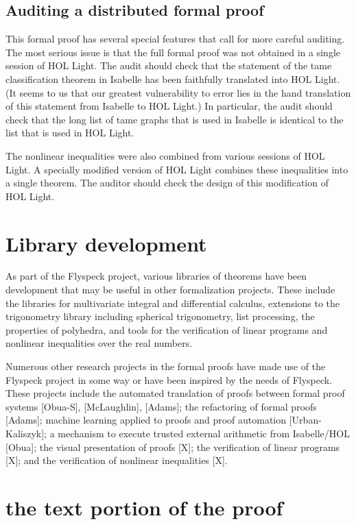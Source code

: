 \subsection{Auditing a distributed formal proof}

This formal proof has several special features that call for more careful auditing.
The most serious issue is that the full formal proof was not obtained in a single session of HOL Light.
The audit should check that the statement of the tame classification theorem in Isabelle has been faithfully translated
into HOL Light.  (It seems to us that our greatest vulnerability to error lies in the hand translation of this statement from
Isabelle to HOL Light.)  In particular, the audit should check that the long list of tame graphs that is used in Isabelle is
identical to the list that is used in HOL Light.

The nonlinear inequalities were also combined from various sessions of HOL Light.  A specially modified version of 
HOL Light combines
these inequalities into a single theorem.  The auditor should check the design of this modification of HOL Light.




\section{Library development} 

As part of the Flyspeck project, various libraries of theorems have been development that may be useful in other formalization
projects.  These include the libraries for multivariate integral and differential calculus, extensions to the trigonometry
library including spherical trigonometry, list processing,
the properties of polyhedra,  and tools for the verification of linear programs and nonlinear
inequalities over the real numbers.

Numerous other research projects in the formal proofs have made use of the Flyspeck project in some way or have been inspired by
the needs of Flyspeck.  These projects include the automated translation of proofs between formal proof systems
[Obua-S], [McLaughlin], [Adams]; the refactoring of formal proofs [Adams]; machine learning applied to proofs and
proof automation [Urban-Kaliszyk]; a mechanism to execute trusted external arithmetic 
from Isabelle/HOL [Obua]; the visual presentation of proofs [X]; the verification of linear programs [X]; and the
verification of nonlinear inequalities [X].

\section{the text portion of the proof}


